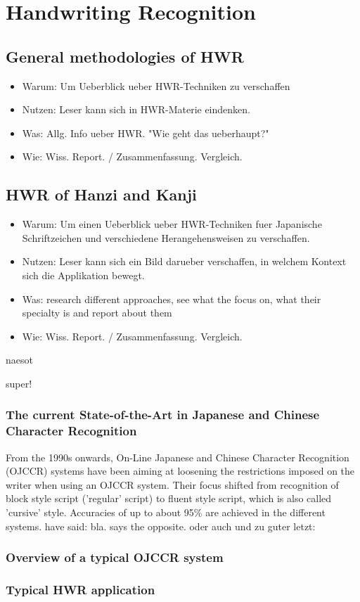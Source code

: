 \chapter{Handwriting Recognition}
\section{General methodologies of HWR}
\begin{itemize}
\item Warum: Um Ueberblick ueber HWR-Techniken zu verschaffen
\item Nutzen: Leser kann sich in HWR-Materie eindenken.
\item Was: Allg. Info ueber HWR. "Wie geht das ueberhaupt?"
\item Wie: Wiss. Report. / Zusammenfassung. Vergleich.
\end{itemize}

\section{HWR of Hanzi and Kanji}
\begin{itemize}
\item Warum: Um einen Ueberblick ueber HWR-Techniken fuer Japanische 
  Schriftzeichen und verschiedene Herangehensweisen zu verschaffen.
\item Nutzen: Leser kann sich ein Bild darueber verschaffen,
  in welchem Kontext sich die Applikation bewegt.
\item Was: research different approaches, see what the focus on, 
  what their specialty is and report about them
\item Wie: Wiss. Report. / Zusammenfassung. Vergleich.
\end{itemize}

\begin{CJK}
  naesot
\end{CJK}

\begin{CJK}
  super!

\end{CJK}
\subsection{The current State-of-the-Art in Japanese and Chinese Character Recognition}
From the 1990s onwards, On-Line Japanese and Chinese Character Recognition 
(OJCCR) systems have been aiming at loosening the restrictions imposed on 
the writer when using an OJCCR system. Their focus shifted from recognition 
of block style script ('regular' script) to fluent style script, 
which is also called 'cursive' style. Accuracies of up to about 95\% are
achieved in the different systems. \cite{LiuJaegerNakagawa2004} have said: 
bla. \cite{Tappert1990} says the opposite. \cite{ChenLee1996} oder auch 
\cite{Nakagawa2008} und \cite{Nakai2003} zu guter letzt: \cite{Santosh2009}

\subsection{Overview of a typical OJCCR system}

\subsection{Typical HWR application}


